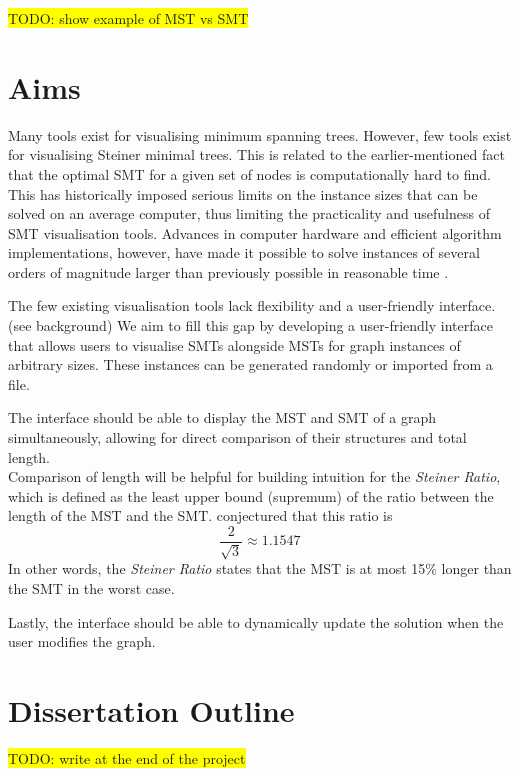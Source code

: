 \documentclass{l4proj}
\begin{document}
\colorbox{yellow}{TODO: show example of MST vs SMT}



\section{Aims}
Many tools exist for visualising minimum spanning trees. However, few tools exist for visualising Steiner minimal trees. This is related to the earlier-mentioned fact that the optimal SMT for a given set of nodes is computationally hard to find. This has historically imposed serious limits on the instance sizes that can be solved on an average computer, thus limiting the practicality and usefulness of SMT visualisation tools.
Advances in computer hardware and efficient algorithm implementations, however, have made it possible to solve instances of several orders of magnitude larger than previously possible in reasonable time \citep{29ee725d11ac4584b72f7fe66c4326fa}.

The few existing visualisation tools lack flexibility and a user-friendly interface. (see background)
We aim to fill this gap by developing a user-friendly interface that allows users to visualise SMTs alongside MSTs for graph instances of arbitrary sizes. These instances can be generated randomly or imported from a file.

The interface should be able to display the MST and SMT of a graph simultaneously, allowing for direct comparison of their structures and total length.
\\
Comparison of length will be helpful for building intuition for the \textit{Steiner Ratio},  which is defined as the least upper bound (supremum) of the ratio between the length of the MST and the SMT.  \cite{Gilbert1968SteinerMT} conjectured that this ratio is $$\frac{2}{\sqrt{3}} \approx 1.1547$$
In other words, the \textit{Steiner Ratio} states that the MST is at most 15\% longer than the SMT in the worst case.

Lastly, the interface should be able to dynamically update the solution when the user modifies the graph.

\section{Dissertation Outline}

\colorbox{yellow}{TODO: write at the end of the project}

\end{document}
